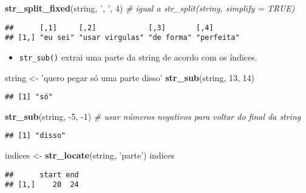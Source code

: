 \documentclass[]{book}
\newenvironment{Shaded}{\begin{snugshade}}{\end{snugshade}}
\newcommand{\KeywordTok}[1]{\textcolor[rgb]{0.13,0.29,0.53}{\textbf{{#1}}}}
\newcommand{\DecValTok}[1]{\textcolor[rgb]{0.00,0.00,0.81}{{#1}}}
\newcommand{\StringTok}[1]{\textcolor[rgb]{0.31,0.60,0.02}{{#1}}}
\newcommand{\CommentTok}[1]{\textcolor[rgb]{0.56,0.35,0.01}{\textit{{#1}}}}
\newcommand{\NormalTok}[1]{{#1}}
\providecommand{\tightlist}{%
  \setlength{\itemsep}{0pt}\setlength{\parskip}{0pt}}
\begin{document}
\begin{Shaded}
\begin{Highlighting}[]
\KeywordTok{str_split_fixed}\NormalTok{(string, }\StringTok{', '}\NormalTok{, }\DecValTok{4}\NormalTok{) }\CommentTok{# igual a str_split(string, simplify = TRUE)}
\end{Highlighting}
\end{Shaded}

\begin{verbatim}
##      [,1]     [,2]            [,3]       [,4]      
## [1,] "eu sei" "usar virgulas" "de forma" "perfeita"
\end{verbatim}

\begin{itemize}
\tightlist
\item
  \texttt{str\_sub()} extrai uma parte da string de acordo com os
  índices.
\end{itemize}

\begin{Shaded}
\begin{Highlighting}[]
\NormalTok{string <-}\StringTok{ 'quero pegar só uma parte disso'}
\KeywordTok{str_sub}\NormalTok{(string, }\DecValTok{13}\NormalTok{, }\DecValTok{14}\NormalTok{)}
\end{Highlighting}
\end{Shaded}

\begin{verbatim}
## [1] "só"
\end{verbatim}

\begin{Shaded}
\begin{Highlighting}[]
\KeywordTok{str_sub}\NormalTok{(string, -}\DecValTok{5}\NormalTok{, -}\DecValTok{1}\NormalTok{) }\CommentTok{# usar números negativos para voltar do final da string}
\end{Highlighting}
\end{Shaded}

\begin{verbatim}
## [1] "disso"
\end{verbatim}

\begin{Shaded}
\begin{Highlighting}[]
\NormalTok{indices <-}\StringTok{ }\KeywordTok{str_locate}\NormalTok{(string, }\StringTok{'parte'}\NormalTok{)}
\NormalTok{indices}
\end{Highlighting}
\end{Shaded}

\begin{verbatim}
##      start end
## [1,]    20  24
\end{verbatim}
\end{document}
